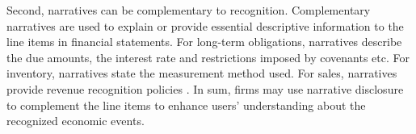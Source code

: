 \documentclass[letterpaper,12pt]{article}
\begin{document}
\begin{spacing}{1.5}
Second, narratives can be complementary to recognition. Complementary narratives are used to explain or provide essential descriptive information to the line items in financial statements. For long-term obligations, narratives describe the due amounts, the interest rate and restrictions imposed by covenants etc. For inventory, narratives state the measurement method used. For sales, narratives provide revenue recognition policies \cite[footnote 4, CON5-7]{fasbStatementFinancialAccounting1984}. In sum, firms may use narrative disclosure to complement the line items to enhance users' understanding about the recognized economic events.

\begin{comment}
	\citeA[footnote 4, CON5-7]{fasbStatementFinancialAccounting1984} gives several examples on the complementary role of notes to financial statements:
	
	\begin{adjustwidth}{1cm}{1cm}
	\begin{singlespace}
	\indent \textit{For example, notes provide essential descriptive information for long-term obligations, including when amounts are due, what interest they bear, and whether important restrictions are imposed by related covenants. For inventory, the notes provide information on the measurement method used---FIFO cost, LIFO cost, current market value, etc. For an estimated litigation liability, an extended discussion of the circumstances, counsel's opinions, and the basis for management's judgment may all be provided in the notes. For sales, useful information about revenue recognition policies may appear only in the notes (FASB Statement No. 47, Disclosure of Long-Term Obligations; ARB No. 43, Chapter 4, ``Inventory Pricing", statement 8; FASB Statement No. 5, Accounting for Contingencies, par. 10; and APB Statement 4, par. 199)}.
	\end{singlespace}
	\end{adjustwidth}
\end{comment}


\end{spacing}
\end{document}
